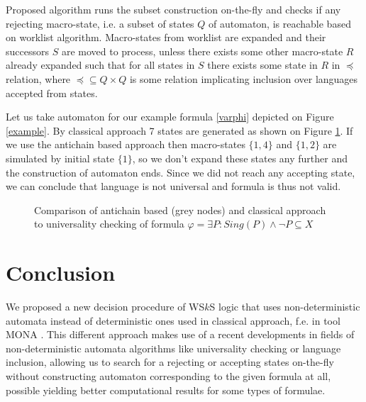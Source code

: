 \documentclass{eeict}
\begin{document}
Proposed algorithm \cite{anti} runs the subset construction on-the-fly and
checks if any rejecting macro-state, i.e. a subset of states $Q$ of automaton,
is reachable based on worklist algorithm. Macro-states from worklist are expanded and
their successors $S$ are moved to process, unless there exists some other
macro-state $R$ already expanded such that for all states in $S$ there exists
some state in $R$ in $\preceq$ relation, where $\preceq \subseteq Q \times Q$ is
some relation implicating inclusion over languages accepted from states.

Let us take automaton for our example formula \ref{varphi} depicted on Figure
\ref{example}. By classical approach 7 states are generated as shown
on Figure \ref{compare}. If we use the antichain based approach then
macro-states $\{1, 4\}$ and $\{1, 2\}$ are simulated by initial state $\{1\}$,
so we don't expand these states any further and the construction of automaton
ends.
Since we did not reach any accepting state, we can conclude that language is not
universal and formula is thus not valid.

\begin{figure}
 \begin{center}
 \end{center}
 \caption{Comparison of antichain based (grey nodes) and classical approach to
 universality checking of formula $\varphi = \exists P: Sing(P) \wedge\neg P
 \subseteq X$}\label{compare}
\end{figure}

\section{Conclusion}

We proposed a new decision procedure of WS$k$S logic that uses non-deterministic
automata instead of deterministic ones used in classical approach, f.e. in tool
MONA \cite{mona}. This different approach makes use of a recent developments in
fields of non-deterministic automata algorithms like universality checking or
language inclusion, allowing us to search for a rejecting or accepting states
on-the-fly without constructing automaton corresponding to the given formula at
all, possible yielding better computational results for some types of formulae.
\end{document}
